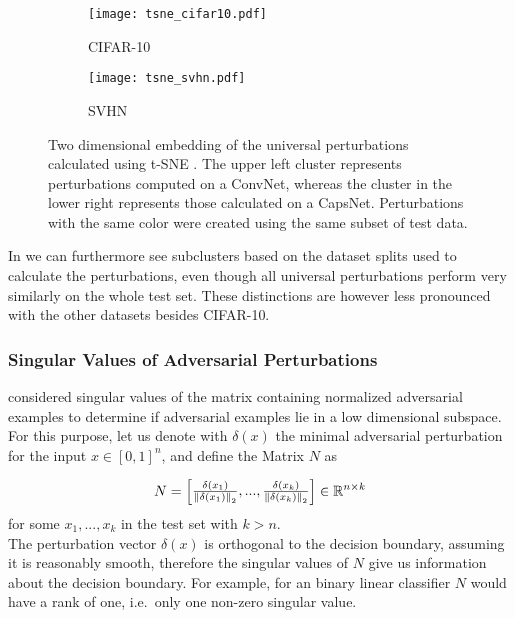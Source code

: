 \begin{figure}
	\centering
	\begin{subfigure}{.5\textwidth}
		\texttt{[image: tsne\_cifar10.pdf]}
		\caption{CIFAR-10}
	\end{subfigure}%
	\begin{subfigure}{.5\textwidth}
		\texttt{[image: tsne\_svhn.pdf]}
		\caption{SVHN}
	\end{subfigure}
	\caption[t-SNE plot of universal perturbations]{Two dimensional embedding of the universal perturbations calculated using t-SNE \citep{tsne}. The upper left cluster represents perturbations computed on a ConvNet, whereas the cluster in the lower right represents those calculated on a CapsNet. Perturbations with the same color were created using the same subset of test data.}
	\label{fig:tsne}
\end{figure}

In  we can furthermore see subclusters based on the dataset splits used to calculate the perturbations, even though all universal perturbations perform very similarly on the whole test set.
These distinctions are however less pronounced with the other datasets besides CIFAR-10.

\subsubsection{Singular Values of Adversarial Perturbations}
\citet{universal} considered singular values of the matrix containing normalized adversarial examples to determine if adversarial examples lie in a low dimensional subspace. \\
For this purpose, let us denote with $\delta(x)$ the minimal adversarial perturbation for the input $x \in [0,1]^n$, and define the Matrix $N$ as

\begin{equation*}
N = \begin{bmatrix}
\frac{\delta(x_1)} {\left \lVert \delta(x_1) \right \rVert _{2}},  ...,  \frac{\delta(x_k)} {\left \lVert \delta(x_k) \right \rVert _{2}} 
\end{bmatrix}
\in \mathbb{R}^{n \times k}
\end{equation*}
for some $x_1, ..., x_k$ in the test set with $k > n$. \\
The perturbation vector $\delta(x)$ is orthogonal to the decision boundary, assuming it is reasonably smooth, therefore the singular values of $N$ give us information about the decision boundary. For example, for an binary linear classifier $N$ would have a rank of one, i.e.\ only one non-zero singular value.

